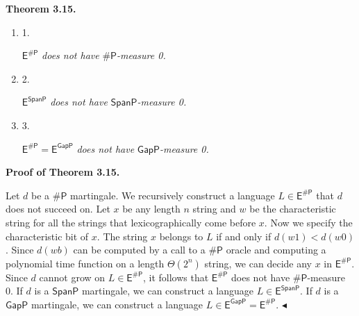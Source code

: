 

\par\medskip\noindent\textbf{
\textbf{Theorem 3.15}\textbf{.}
}\par



\begin{enumerate}


\item[] 
1. 


$\mathsf{E}^{{\mathsf{\#}\mathsf{P}}}$\emph{ does not have }${\mathsf{\#}\mathsf{P}}$\emph{-measure 0.}\par





\item[] 
2. 


$\mathsf{E}^{\mathsf{SpanP}}$\emph{ does not have }$\mathsf{SpanP}$\emph{-measure 0.}\par





\item[] 
3. 


$\mathsf{E}^{{\mathsf{\#}\mathsf{P}}}=\mathsf{E}^{\mathsf{GapP}}$\emph{ does not have }$\mathsf{GapP}$\emph{-measure 0.}\par





\end{enumerate}






\par\medskip\noindent\textbf{Proof of Theorem 3.15.}\par




Let $d$ be a ${\mathsf{\#}\mathsf{P}}$ martingale. We recursively construct a language
$L\in\mathsf{E}^{{\mathsf{\#}\mathsf{P}}}$ that $d$ does not succeed on. Let $x$ be any length $n$
string and $w$ be the characteristic string for all the strings that
lexicographically come before $x$. Now we specify the characteristic bit of
$x$. The string $x$ belongs to $L$ if and only if $d(w1)<d(w0)$. Since
$d(wb)$ can be computed by a call to a ${\mathsf{\#}\mathsf{P}}$ oracle and computing a
polynomial time function on a length $\Theta(2^{n})$ string, we can decide any $x$ in $\mathsf{E}^{\mathsf{\#}\mathsf{P}}$. Since $d$ cannot grow on
$L\in\mathsf{E}^{\mathsf{\#}\mathsf{P}}$, it follows that $\mathsf{E}^{\mathsf{\#}\mathsf{P}}$ does not have ${\mathsf{\#}\mathsf{P}}$-measure 0. If $d$ is a $\mathsf{SpanP}$ martingale, we can construct a language $L\in\mathsf{E}^{\mathsf{SpanP}}$. If $d$ is a $\mathsf{GapP}$ martingale, we can construct a language $L\in\mathsf{E}^{\mathsf{GapP}}=\mathsf{E}^{{\mathsf{\#}\mathsf{P}}}$.
$\blacktriangleleft$\par




